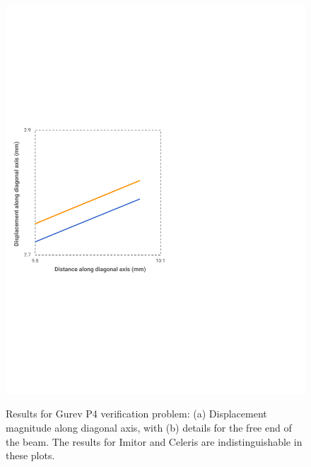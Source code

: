 \begin{figure}[ht!]
{		\includegraphics[scale=0.45]{media/5-verif/3-gurev4/gurev4-2.pdf}
\label{fig:gurev4-2}}		
%
\caption{Results for Gurev P4 verification problem: (a) Displacement magnitude along diagonal axis, with (b) details for the free end of the beam. The results for Imitor and Celeris are indistinguishable in these plots.}
\label{fig:gurev4}
\end{figure}
\vfil

